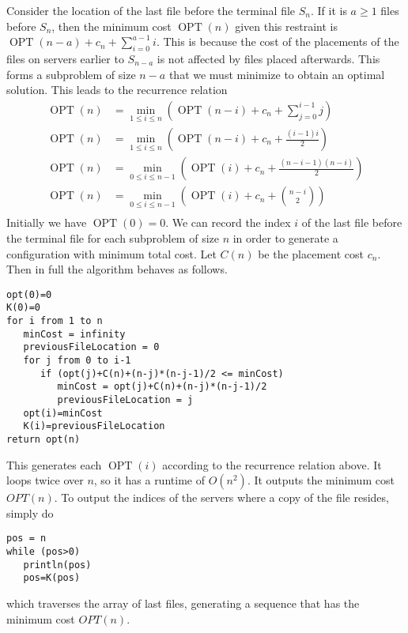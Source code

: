 \documentclass[12pt]{article}
\begin{document}
Consider the location of the last file before the terminal file \(S_n\). If it is \(a \geq 1\) files before \(S_n\),
then the minimum cost \(\operatorname{OPT}(n)\) given this restraint is \(\operatorname{OPT}(n-a)+c_n+\sum_{i=0}^{a-1}i\).
This is because the cost of the placements of the files on servers earlier to \(S_{n-a}\) is not affected by files placed
afterwards. This forms a subproblem of size \(n-a\) that we must minimize to obtain an optimal solution. This leads to the
recurrence relation
\begin{align*}
        \operatorname{OPT}(n)&=\min_{1\leq i\leq n}\left(\operatorname{OPT}(n-i)+c_n+\sum_{j=0}^{i-1}j\right)\\
        \operatorname{OPT}(n)&=\min_{1\leq i\leq n}\left(\operatorname{OPT}(n-i)+c_n+\frac{(i-1)i}{2}\right)\\
        \operatorname{OPT}(n)&=\min_{0\leq i\leq n-1}\left(\operatorname{OPT}(i)+c_n+\frac{(n-i-1)(n-i)}{2}\right)\\
        \operatorname{OPT}(n)&=\min_{0\leq i\leq n-1}\left(\operatorname{OPT}(i)+c_n+\binom{n-i}{2}\right)\\
\end{align*}
Initially we have \(\operatorname{OPT}(0)=0\). We can record the index \(i\) of the last file before the terminal file for
each subproblem of size \(n\) in order to generate a configuration with minimum total cost. Let \(C(n)\) be the placement cost \(c_n\).
Then in full the algorithm behaves as follows.
\begin{verbatim}
opt(0)=0
K(0)=0
for i from 1 to n
   minCost = infinity
   previousFileLocation = 0
   for j from 0 to i-1
      if (opt(j)+C(n)+(n-j)*(n-j-1)/2 <= minCost)
         minCost = opt(j)+C(n)+(n-j)*(n-j-1)/2
         previousFileLocation = j
   opt(i)=minCost
   K(i)=previousFileLocation
return opt(n)
\end{verbatim}
This generates each \(\operatorname{OPT}(i)\) according to the recurrence relation above. It loops twice over \(n\), so it has a runtime of \(O(n^2)\).
It outputs the minimum cost \(OPT(n)\). To output the indices of the servers where a copy of the file resides, simply do
\begin{verbatim}
pos = n
while (pos>0)
   println(pos)
   pos=K(pos)
\end{verbatim}
which traverses the array of last files, generating a sequence that has the minimum cost \(OPT(n)\).
\end{document}

